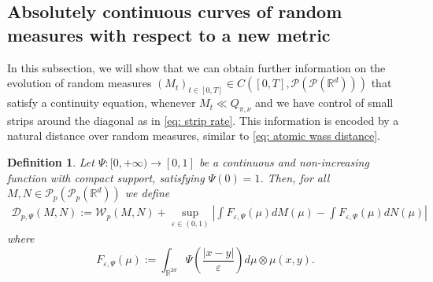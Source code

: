 \documentclass[10pt,leqno]{amsart}
\numberwithin{equation}{section}
\newtheorem{df}[teorema]{Definition}
\newcommand{\R}{\mathbb{R}}
\newcommand{\Q}{\mathbb{Q}}
\newcommand{\PP}{\mathcal{P}}
\renewcommand{\Q}{Q}
\begin{document}
\subsection{Absolutely continuous curves of random measures with respect to a new metric}
In this subsection, we will show that we can obtain further information on the evolution of random measures $(M_t)_{t\in[0,T]} \in C([0,T],\PP(\PP(\R^d)))$ that satisfy a continuity equation, whenever $M_t \ll \Q_{\pi,\nu}$ and we have control of small strips around the diagonal as in \eqref{eq: strip rate}.
This information is encoded by a natural distance over random measures, similar to \eqref{eq: atomic wass distance}.

\begin{df}\label{def: atomic wass on wass}
    Let $\Psi:[0,+\infty)\to[0,1]$ be a continuous and non-increasing function with compact support, satisfying $\Psi(0) =1 $. Then, for all $M,N \in \PP_p(\PP_p(\R^d))$ we define
    \begin{equation}
    \begin{aligned}
    \mathcal{D}_{p,\Psi}(M,N) := \mathcal{W}_p(M,N) +
    \sup_{\varepsilon\in(0,1)} \left| \int F_{\varepsilon,\Psi}(\mu) dM(\mu) - \int F_{\varepsilon,\Psi}(\mu) dN(\mu) \right|
    \end{aligned}
    \end{equation}
    where
    \begin{equation}
        F_{\varepsilon,\Psi}(\mu):=  \int_{\R^{2d}} \Psi\left( \frac{|x-y|}{\varepsilon} \right) d\mu\otimes \mu(x,y).
    \end{equation}
\end{df}
\end{document}
